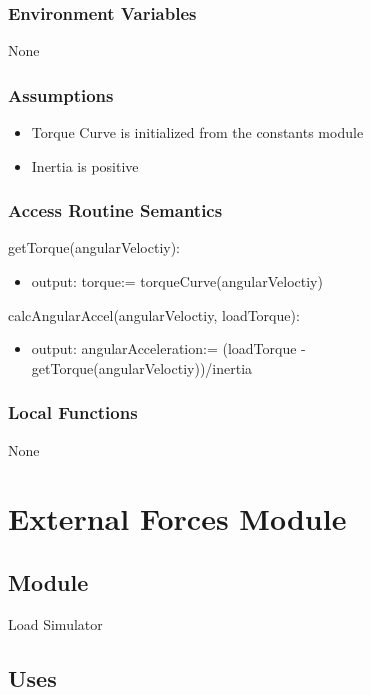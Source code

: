 \documentclass[12pt, titlepage]{article}
\begin{document}
\subsubsection{Environment Variables}

None

\subsubsection{Assumptions}
\begin{itemize}
  \item Torque Curve is initialized from the constants module
  \item Inertia is positive
\end{itemize}

\subsubsection{Access Routine Semantics}

\noindent getTorque(angularVeloctiy):
\begin{itemize}
\item output: torque:= torqueCurve(angularVeloctiy) 
\end{itemize}

\noindent calcAngularAccel(angularVeloctiy, loadTorque):
\begin{itemize}
\item output: angularAcceleration:= (loadTorque - getTorque(angularVeloctiy))/inertia
\end{itemize}

\subsubsection{Local Functions}

None

\newpage

\section{External Forces Module} \label{Module_external_forces} 

\subsection{Module}

Load Simulator

\subsection{Uses}
\end{document}
